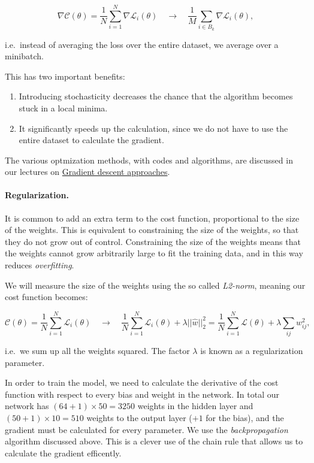 $$ \nabla \mathcal{C}(\theta) = \frac{1}{N} \sum_{i=1}^N \nabla \mathcal{L}_i(\theta) \quad \rightarrow \quad
\frac{1}{M} \sum_{i \in B_k} \nabla \mathcal{L}_i(\theta) ,$$

i.e.~instead of averaging the loss over the entire dataset, we average over a minibatch.  

This has two important benefits:  
\begin{enumerate}
\item Introducing stochasticity decreases the chance that the algorithm becomes stuck in a local minima.  

\item It significantly speeds up the calculation, since we do not have to use the entire dataset to calculate the gradient.  
\end{enumerate}

\noindent
The various optmization  methods, with codes and algorithms,  are discussed in our lectures on \href{{https://compphysics.github.io/MachineLearning/doc/pub/Splines/html/Splines-bs.html}}{Gradient descent approaches}.

\paragraph{Regularization.}
It is common to add an extra term to the cost function, proportional
to the size of the weights.  This is equivalent to constraining the
size of the weights, so that they do not grow out of control.
Constraining the size of the weights means that the weights cannot
grow arbitrarily large to fit the training data, and in this way
reduces \emph{overfitting}.

We will measure the size of the weights using the so called \emph{L2-norm}, meaning our cost function becomes:  

$$  \mathcal{C}(\theta) = \frac{1}{N} \sum_{i=1}^N \mathcal{L}_i(\theta) \quad \rightarrow \quad
\frac{1}{N} \sum_{i=1}^N  \mathcal{L}_i(\theta) + \lambda \lvert \lvert \hat{w} \rvert \rvert_2^2 
= \frac{1}{N} \sum_{i=1}^N  \mathcal{L}(\theta) + \lambda \sum_{ij} w_{ij}^2,$$  

i.e.~we sum up all the weights squared. The factor $\lambda$ is known as a regularization parameter.

In order to train the model, we need to calculate the derivative of
the cost function with respect to every bias and weight in the
network.  In total our network has $(64 + 1)\times 50=3250$ weights in
the hidden layer and $(50 + 1)\times 10=510$ weights to the output
layer ($+1$ for the bias), and the gradient must be calculated for
every parameter.  We use the \emph{backpropagation} algorithm discussed
above. This is a clever use of the chain rule that allows us to
calculate the gradient efficently. 


